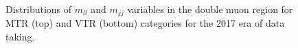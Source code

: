 \begin{figure}[htbp]
{    }
  \caption{Distributions of $m_{ll}$ and $m_{jj}$ variables in the double muon region for MTR (top) and VTR (bottom) categories for the 2017 era of data taking.}
  \label{fig:2017_Zee_1}
\end{figure}

